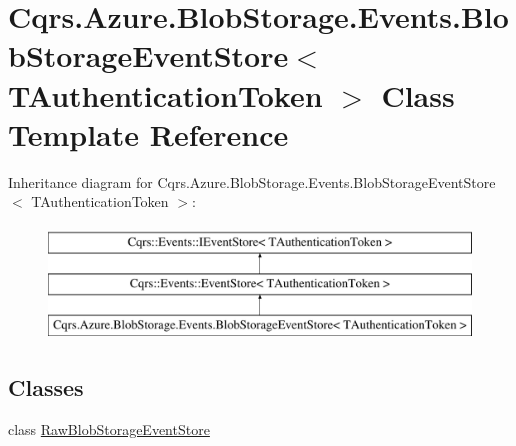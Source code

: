 \hypertarget{classCqrs_1_1Azure_1_1BlobStorage_1_1Events_1_1BlobStorageEventStore}{}\section{Cqrs.\+Azure.\+Blob\+Storage.\+Events.\+Blob\+Storage\+Event\+Store$<$ T\+Authentication\+Token $>$ Class Template Reference}
\label{classCqrs_1_1Azure_1_1BlobStorage_1_1Events_1_1BlobStorageEventStore}
Inheritance diagram for Cqrs.\+Azure.\+Blob\+Storage.\+Events.\+Blob\+Storage\+Event\+Store$<$ T\+Authentication\+Token $>$\+:\begin{figure}[H]
\begin{center}
\leavevmode
\includegraphics[height=3.000000cm]{classCqrs_1_1Azure_1_1BlobStorage_1_1Events_1_1BlobStorageEventStore}
\end{center}
\end{figure}
\subsection*{Classes}
\begin{DoxyCompactItemize}
\item 
class \hyperlink{classCqrs_1_1Azure_1_1BlobStorage_1_1Events_1_1BlobStorageEventStore_1_1RawBlobStorageEventStore}{Raw\+Blob\+Storage\+Event\+Store}
\end{DoxyCompactItemize}
